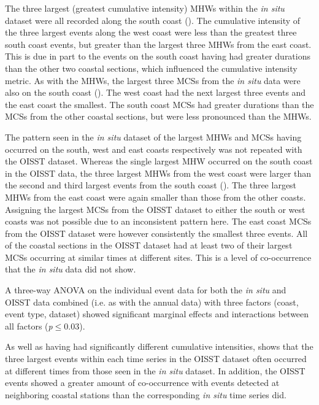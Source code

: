 \documentclass[a4paper,10pt,review]{elsarticle}
\begin{document}
The three largest (greatest cumulative intensity) MHWs within the \emph{in situ} dataset were all recorded along the south coast (). The cumulative intensity of the three largest events along the west coast were less than the greatest three south coast events, but greater than the largest three MHWs from the east coast. This is due in part to the events on the south coast having had greater durations than the other two coastal sections, which influenced the cumulative intensity metric. As with the MHWs, the largest three MCSs from the \emph{in situ} data were also on the south coast (). The west coast had the next largest three events and the east coast the smallest. The south coast MCSs had greater durations than the MCSs from the other coastal sections, but were less pronounced than the MHWs.

The pattern seen in the \emph{in situ} dataset of the largest MHWs and MCSs having occurred on the south, west and east coasts respectively was not repeated with the OISST dataset. Whereas the single largest MHW occurred on the south coast in the OISST data, the three largest MHWs from the west coast were larger than the second and third largest events from the south coast (). The three largest MHWs from the east coast were again smaller than those from the other coasts. Assigning the largest MCSs from the OISST dataset to either the south or west coasts was not possible due to an inconsistent pattern here. The east coast MCSs from the OISST dataset were however consistently the smallest three events. All of the coastal sections in the OISST dataset had at least two of their largest MCSs occurring at similar times at different sites. This is a level of co-occurrence that the \emph{in situ} data did not show.

A three-way ANOVA on the individual event data for both the \emph{in situ} and OISST data combined (i.e. as with the annual data) with three factors (coast, event type, dataset) showed significant marginal effects and interactions between all factors (\emph{p}$\leq$0.03).

As well as having had significantly different cumulative intensities,  shows that the three largest events within each time series in the OISST dataset often occurred at different times from those seen in the \emph{in situ} dataset. In addition, the OISST events showed a greater amount of co-occurrence with events detected at neighboring coastal stations than the corresponding \emph{in situ} time series did.
\end{document}
